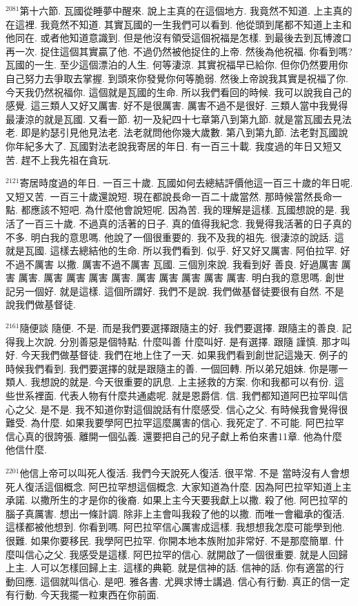 \documentclass{book}
\begin{document}
$^{2081}$第十六節.
瓦國從睡夢中醒來.
說上主真的在這個地方.
我竟然不知道.
上主真的在這裡.
我竟然不知道.
其實瓦國的一生我們可以看到.
他從頭到尾都不知道上主和他同在.
或者他知道意識到.
但是他沒有領受這個祝福是怎樣.
到最後去到瓦博渡口再一次.
捉住這個其實贏了他.
不過仍然被他捉住的上帝.
然後為他祝福.
你看到嗎?瓦國的一生.
至少這個漂泊的人生.
何等淒涼.
其實祝福早已給你.
但你仍然要用你自己努力去爭取去掌握.
到頭來你發覺你何等脆弱.
然後上帝說我其實是祝福了你.
今天我仍然祝福你.
這個就是瓦國的生命.
所以我們看回的時候.
我可以說我自己的感覺.
這三類人又好又厲害.
好不是很厲害.
厲害不過不是很好.
三類人當中我覺得最淒涼的就是瓦國.
又看一節.
初一及紀四十七章第八到第九節.
就是當瓦國去見法老.
即是約瑟引見他見法老.
法老就問他你幾大歲數.
第八到第九節.
法老對瓦國說你年紀多大了.
瓦國對法老說我寄居的年日.
有一百三十載.
我度過的年日又短又苦.
趕不上我先祖在貪玩.

$^{2121}$寄居時度過的年日.
一百三十歲.
瓦國如何去總結評價他這一百三十歲的年日呢.
又短又苦.
一百三十歲還說短.
現在都說長命一百二十歲當然.
那時候當然長命一點.
都應該不短吧.
為什麼他會說短呢.
因為苦.
我的理解是這樣.
瓦國想說的是.
我活了一百三十歲.
不過真的活著的日子.
真的值得我紀念.
我覺得我活著的日子真的不多.
明白我的意思嗎.
他說了一個很重要的.
我不及我的祖先.
很淒涼的說話.
這就是瓦國.
這樣去總結他的生命.
所以我們看到.
似乎.
好又好又厲害.
阿伯拉罕.
好不過不厲害 以撒.
厲害不過不厲害 瓦國.
三個別來說.
我看到好 善良.
好過厲害 厲害 厲害.
厲害 厲害 厲害 厲害.
厲害 厲害 厲害 厲害 厲害.
明白我的意思嗎.
創世記另一個好.
就是這樣.
這個所謂好.
我們不是說.
我們做基督徒要很有自然.
不是說我們做基督徒.

$^{2161}$隨便談 隨便.
不是.
而是我們要選擇跟隨主的好.
我們要選擇.
跟隨主的善良.
記得我上次說.
分別善惡是個特點.
什麼叫善 什麼叫好.
是有選擇.
跟隨 謹慎.
那才叫好.
今天我們做基督徒.
我們在地上住了一天.
如果我們看到創世記這幾天.
例子的時候我們看到.
我們要選擇的就是跟隨主的善.
一個回轉.
所以弟兄姐妹.
你是哪一類人.
我想說的就是.
今天很重要的訊息.
上主拯救的方案.
你和我都可以有份.
這些世系裡面.
代表人物有什麼共通處呢.
就是恩爵信.
信.
我們都知道阿巴拉罕叫信心之父.
是不是.
我不知道你對這個說話有什麼感受.
信心之父.
有時候我會覺得很難受.
為什麼.
如果我要學阿巴拉罕這麼厲害的信心.
我死定了.
不可能.
阿巴拉罕信心真的很誇張.
離開一個弘義.
還要把自己的兒子獻上希伯來書11章.
他為什麼 他信什麼.

$^{2201}$他信上帝可以叫死人復活.
我們今天說死人復活.
很平常.
不是 當時沒有人會想死人復活這個概念.
阿巴拉罕想這個概念.
大家知道為什麼.
因為阿巴拉罕知道上主承諾.
以撒所生的才是你的後裔.
如果上主今天要我獻上以撒.
殺了他.
阿巴拉罕的腦子真厲害.
想出一條計調.
除非上主會叫我殺了他的以撒.
而唯一會繼承的復活.
這樣都被他想到.
你看到嗎.
阿巴拉罕信心厲害成這樣.
我想想我怎麼可能學到他.
很難.
如果你要移民.
我學阿巴拉罕.
你開本地本族附加非常好.
不是那麼簡單.
什麼叫信心之父.
我感受是這樣.
阿巴拉罕的信心.
就開啟了一個很重要.
就是人回歸上主.
人可以怎樣回歸上主.
這樣的典範.
就是信神的話.
信神的話.
你有適當的行動回應.
這個就叫信心.
是吧.
雅各書.
尤興求博士講過.
信心有行動.
真正的信一定有行動.
今天我擺一粒東西在你前面.
\end{document}
